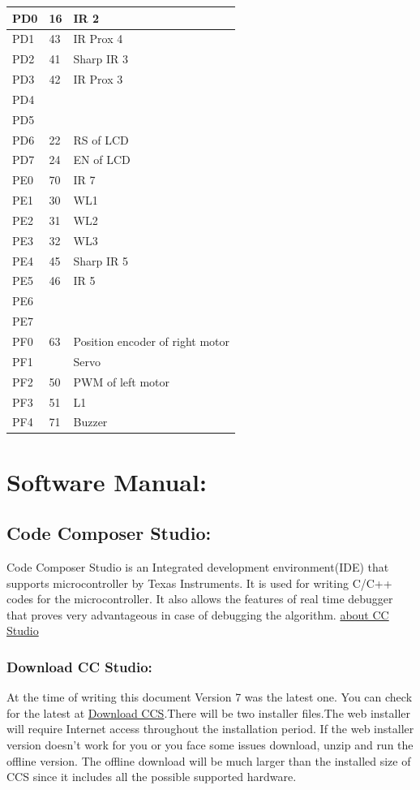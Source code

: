 \documentclass[a4paper,10pt,oneside]{article}
\begin{document}
{\begin{longtable}{|p{}|p{}|p{}|}
			PD0	&16	&IR 2\\ \hline
			PD1&	43&	IR Prox 4\\ \hline
			PD2&	41&	Sharp IR 3\\ \hline
			PD3&	42&	IR Prox 3\\ \hline
			PD4&	&	\\ \hline
			PD5&	&	\\ \hline
			PD6&	22&	RS of LCD\\ \hline
			PD7&	24&	EN of LCD\\ \hline
			
			PE0&	70&IR 7\\ \hline
			PE1&	30&	WL1\\ \hline
			PE2&	31&	WL2\\ \hline
			PE3&	32&	WL3\\ \hline
			PE4&	45&	Sharp IR 5\\ \hline
			PE5&	46&	IR 5\\ \hline
			PE6&	&\\ \hline
			PE7&	&	\\ \hline
			
			PF0&	63&	Position encoder of right motor\\ \hline
			PF1&	&	Servo\\ \hline
			PF2&	50&	PWM of left motor\\ \hline
			PF3&	51	&L1\\ \hline
			PF4&	71&	Buzzer\\ \hline
			
		\end{longtable}
	\newpage
	\section{\textbf{Software Manual:}}
		\subsection{\textbf{Code Composer Studio:}}
			{Code Composer Studio is an Integrated development environment(IDE) that supports microcontroller by Texas Instruments. It is used for writing C/C++ codes for the microcontroller. It also allows the features of real time debugger that proves very advantageous in case of debugging the algorithm.
				\href{http://www.ti.com/tool/ccstudio}{about CC Studio}}}
			\subsubsection{\textbf{Download CC Studio:}}
			{At the time of writing this document Version 7 was the latest one. You can check for the latest at \href{http://processors.wiki.ti.com/index.php/Download_CCS}{Download CCS}.There will be two installer files.The web installer will require Internet access throughout the installation period. If the web installer version doesn't work for you or you face some issues download, unzip and run the offline version. The offline download will be much larger than the installed size of CCS since it includes all the possible supported hardware.}
\end{document}
